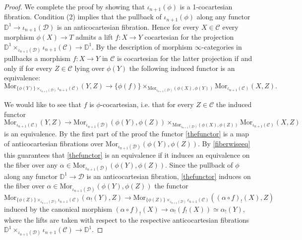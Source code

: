 \documentclass[10pt,oneside]{article}
\numberwithin{equation}{section} %
\numberwithin{figure}{section} %
\theoremstyle{plain}
\theoremstyle{definition}
\newcommand{\bD}{{\mathbb D}}
\newcommand{\mC}{{\mathcal C}}
\newcommand{\mD}{{\mathcal D}}
\newcommand{\Mor}{{\mathrm{Mor}}}
\begin{document}
\begin{proof}
We complete the proof by showing that $\iota_{n+1}(\phi)$ is a 1-cocartesian fibration.
Condition (2) implies that the pullback of $\iota_{n+1}(\phi)$ along any functor $\bD^1 \to \iota_{n+1}(\mD) $ is an anticocartesian fibration.
Hence for every $X \in \mC $ every morphism $\phi(X) \to T$
admits a lift $f: X \to Y $ cocartesian for the projection
$\bD^1 \times_{\iota_{n+1}(\mD)} \iota_{n+1}(\mC) \to \bD^1 $.
By the description of morphism $\infty$-categories in pullbacks a morphism $f: X \to Y $ in $\mC$ is cocartesian for the latter projection
if and only if for every $Z \in \mC $ lying over $\phi(Y)$ the following induced functor is an equivalence:
$$ \Mor_{\{\phi(Y)\}\times_{\iota_{n+1}(\mD)} \iota_{n+1}(\mC)}(Y,Z) \to \{\phi(f)\} \times_{\Mor_{\iota_{n+1}(\mD)}(\phi(X),\phi(Y))} \Mor_{\iota_{n+1}(\mC)}(X,Z).$$

We would like to see that $f$ is $\phi$-cocartesian, i.e. that for every $Z \in \mC$ the induced functor
\begin{equation}\label{thefunctor}
    \Mor_{\iota_{n+1}(\mC)}(Y,Z) \to \Mor_{\iota_{n+1}(\mD)}(\phi(Y),\phi(Z)) \times_{\Mor_{\iota_{n+1}(\mD)}(\phi(X),\phi(Z))} \Mor_{\iota_{n+1}(\mC)}(X,Z)
\end{equation}
    is an equivalence.
By the first part of the proof 
the functor \ref{thefunctor} is a map of anticocartesian fibrations over 
$\Mor_{\iota_{n+1}(\mD)}(\phi(Y),\phi(Z))$.
By \cref{fiberwiseeq} this guarantees that \ref{thefunctor} is an equivalence if it induces an equivalence on the fiber over any $\alpha \in \Mor_{\iota_{n+1}(\mD)}(\phi(Y),\phi(Z))$.
Since the pullback of $\phi$ along any functor $\bD^1 \to \mD$ is an anticocartesian fibration, \ref{thefunctor} induces on the fiber over $\alpha \in \Mor_{\iota_{n+1}(\mD)}(\phi(Y),\phi(Z))$ the functor
$$\Mor_{\{\phi(Z)\}\times_{\iota_{n+1}(\mD)} \iota_{n+1}(\mC)}(\alpha_!(Y),Z) \to \Mor_{\{\phi(Z)\}\times_{\iota_{n+1}(\mD)} \iota_{n+1}(\mC)}((\alpha \circ f)_!(X),Z)$$
induced by the canonical morphism $(\alpha \circ f)_!(X) \to \alpha_!(f_!(X)) \simeq \alpha_!(Y),$
where the lifts are taken with respect to the respective anticocartesian fibrations
$\bD^1 \times_{\iota_{n+1}(\mD)} \iota_{n+1}(\mC) \to \bD^1 $.



\end{proof}
\end{document}
